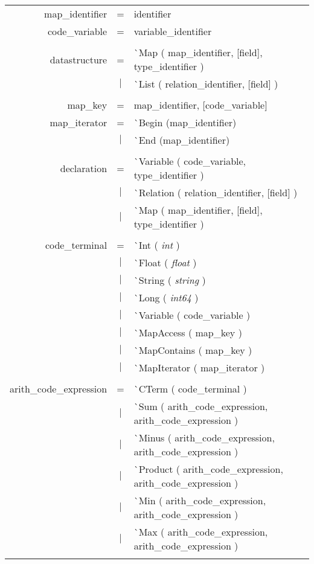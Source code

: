 \documentclass{article}
\begin{document}
\begin{tabular}[ht] {rcl}
map\_identifier &=& identifier\\
code\_variable &=& variable\_identifier\\
\\
datastructure &=& \`{}Map ( map\_identifier, [field], type\_identifier )\\
&$\lvert$ & \`{}List ( relation\_identifier, [field] )\\
\\
map\_key &=& map\_identifier, [code\_variable] \\
map\_iterator &=& \`{}Begin (map\_identifier)\\
&$\lvert$ & \`{}End (map\_identifier)\\
\\
declaration &=& \`{}Variable ( code\_variable, type\_identifier )\\
&$\lvert$ & \`{}Relation ( relation\_identifier, [field] )\\ 
&$\lvert$ & \`{}Map ( map\_identifier, [field], type\_identifier )\\
\\
code\_terminal &=& \`{}Int ( \emph{int} )\\
&$\lvert$ & \`{}Float ( \emph{float} )\\
&$\lvert$ & \`{}String ( \emph{string} )\\
&$\lvert$ & \`{}Long ( \emph{int64} )\\
&$\lvert$ & \`{}Variable ( code\_variable )\\
&$\lvert$ & \`{}MapAccess ( map\_key )\\
&$\lvert$ & \`{}MapContains ( map\_key )\\
&$\lvert$ & \`{}MapIterator ( map\_iterator )\\
\\
arith\_code\_expression &=& \`{}CTerm ( code\_terminal )\\
&$\lvert$ & \`{}Sum ( arith\_code\_expression, arith\_code\_expression )\\
&$\lvert$ & \`{}Minus ( arith\_code\_expression, arith\_code\_expression )\\
&$\lvert$ & \`{}Product ( arith\_code\_expression, arith\_code\_expression )\\
&$\lvert$ & \`{}Min ( arith\_code\_expression, arith\_code\_expression ) \\
&$\lvert$ & \`{}Max ( arith\_code\_expression, arith\_code\_expression ) \\
\\

\end{tabular}
\end{document}
